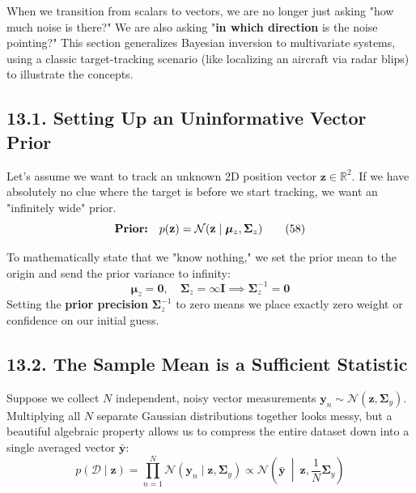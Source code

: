 \documentclass{article}
\begin{document}
When we transition from scalars to vectors, we are no longer just asking "how much noise is there?" We are also asking "\textbf{in which direction} is the noise pointing?" This section generalizes Bayesian inversion to multivariate systems, using a classic target-tracking scenario (like localizing an aircraft via radar blips) to illustrate the concepts.

\subsection*{13.1. Setting Up an Uninformative Vector Prior}
Let's assume we want to track an unknown 2D position vector $\mathbf{z} \in \mathbb{R}^2$. If we have absolutely no clue where the target is before we start tracking, we want an "infinitely wide" prior. 
\begin{equation}
\text{\textbf{Prior:}} \quad p(\mathbf{z}) = \mathcal{N}(\mathbf{z} \mid \boldsymbol{\mu}_z, \boldsymbol{\Sigma}_z) \tag{58}
\end{equation}

To mathematically state that we "know nothing," we set the prior mean to the origin and send the prior variance to infinity:
\begin{equation*}
\boldsymbol{\mu}_z = \mathbf{0}, \quad \boldsymbol{\Sigma}_z = \infty \mathbf{I} \implies \boldsymbol{\Sigma}_z^{-1} = \mathbf{0}
\end{equation*}
Setting the \textbf{prior precision} $\boldsymbol{\Sigma}_z^{-1}$ to zero means we place exactly zero weight or confidence on our initial guess.

\subsection*{13.2. The Sample Mean is a Sufficient Statistic}
Suppose we collect $N$ independent, noisy vector measurements $\mathbf{y}_n \sim \mathcal{N}(\mathbf{z}, \boldsymbol{\Sigma}_y)$. Multiplying all $N$ separate Gaussian distributions together looks messy, but a beautiful algebraic property allows us to compress the entire dataset down into a single averaged vector $\bar{\mathbf{y}}$:
\begin{equation}
p(\mathcal{D} \mid \mathbf{z}) = \prod_{n=1}^N \mathcal{N}(\mathbf{y}_n \mid \mathbf{z}, \boldsymbol{\Sigma}_y) \propto \mathcal{N}\left(\bar{\mathbf{y}} \ \middle|\ \mathbf{z}, \frac{1}{N}\boldsymbol{\Sigma}_y\right) \tag{59}
\end{equation}
\end{document}
